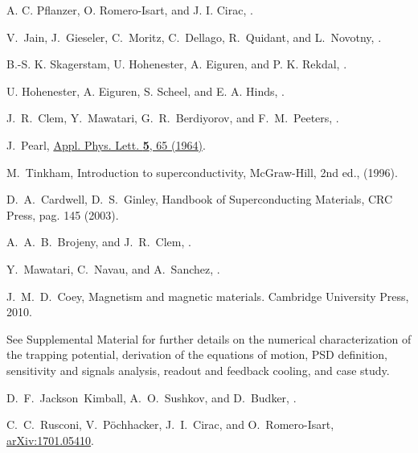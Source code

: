 \documentclass[twocolumn,superscriptaddress,floatfix,preprintnumbers,prl]{revtex4}
\begin{document}
\begin{thebibliography}{27}
A. C. Pflanzer, O. Romero-Isart, and J. I. Cirac, \href{http://journals.aps.org/pra/abstract/10.1103/PhysRevA.86.013802}{}.

V.~Jain, J.~Gieseler, C.~Moritz, C.~Dellago, R.~Quidant, and L.~Novotny, \href{http://journals.aps.org/prl/abstract/10.1103/PhysRevLett.116.243601}{}.

B.-S. K. Skagerstam, U. Hohenester, A. Eiguren, and P. K. Rekdal, \href{http://journals.aps.org/prl/abstract/10.1103/PhysRevLett.97.070401}{}.

U. Hohenester, A. Eiguren, S. Scheel, and E. A. Hinds, \href{http://journals.aps.org/pra/abstract/10.1103/PhysRevA.76.033618}{}.

J.~R.~Clem, Y.~Mawatari, G.~R.~Berdiyorov, and F.~M.~Peeters, \href{http://dx.doi.org/10.1103/PhysRevB.85.144511}{}.

J.~Pearl, \href{http://dx.doi.org/10.1063/1.1754056}{Appl. Phys. Lett.  {\bf 5}, 65 (1964)}.

M.~Tinkham, Introduction to superconductivity, McGraw-Hill, 2nd ed., (1996). %

D.~A.~Cardwell, D.~S.~Ginley, 
Handbook of Superconducting Materials,
CRC Press, pag. 145 (2003).

A.~A.~B.~Brojeny, and J.~R.~Clem,
\href{https://journals.aps.org/prb/abstract/10.1103/PhysRevB.68.174514}{}.

Y.~Mawatari, C.~Navau, and A.~Sanchez,
\href{http://journals.aps.org/prb/abstract/10.1103/PhysRevB.85.134524}{}.

J.~M.~D.~Coey,  Magnetism and magnetic materials. Cambridge University Press, 2010.

See Supplemental Material for further details on the numerical characterization of the trapping potential, derivation of the equations of motion, PSD definition, sensitivity and signals analysis, readout and feedback cooling, and case study.

D.~F.~Jackson~Kimball, A.~O.~Sushkov, and D.~Budker, 
\href{http://journals.aps.org/prl/pdf/10.1103/PhysRevLett.116.190801}{}.

C.~C.~Rusconi, V.~P\"ochhacker, J.~I.~Cirac, and O.~Romero-Isart, \href{https://arxiv.org/abs/1701.05410}{arXiv:1701.05410}.



\end{thebibliography}
\end{document}
